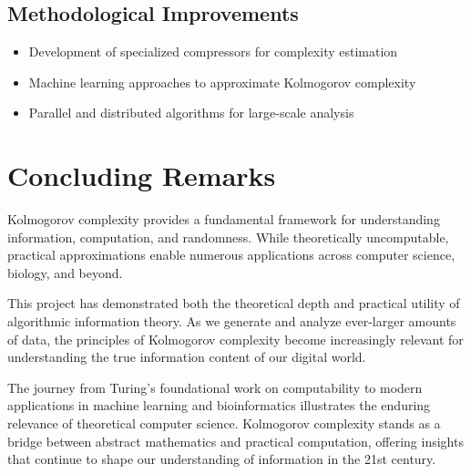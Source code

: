 \documentclass[12pt,a4paper]{report}
\begin{document}
\subsection{Methodological Improvements}

\begin{itemize}
    \item Development of specialized compressors for complexity estimation
    \item Machine learning approaches to approximate Kolmogorov complexity
    \item Parallel and distributed algorithms for large-scale analysis
\end{itemize}

\section{Concluding Remarks}

Kolmogorov complexity provides a fundamental framework for understanding information, computation, and randomness. While theoretically uncomputable, practical approximations enable numerous applications across computer science, biology, and beyond.

This project has demonstrated both the theoretical depth and practical utility of algorithmic information theory. As we generate and analyze ever-larger amounts of data, the principles of Kolmogorov complexity become increasingly relevant for understanding the true information content of our digital world.

The journey from Turing's foundational work on computability to modern applications in machine learning and bioinformatics illustrates the enduring relevance of theoretical computer science. Kolmogorov complexity stands as a bridge between abstract mathematics and practical computation, offering insights that continue to shape our understanding of information in the 21st century.
\end{document}
